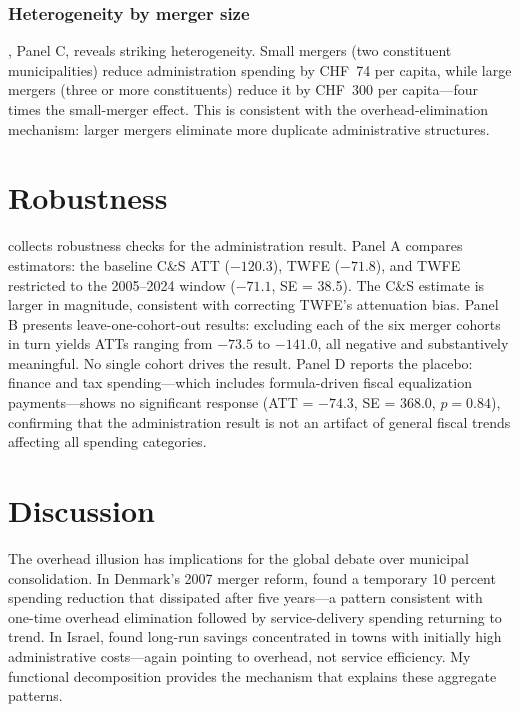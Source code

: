 \documentclass[12pt]{article}
\begin{document}
\subsubsection*{Heterogeneity by merger size} , Panel C, reveals striking heterogeneity. Small mergers (two constituent municipalities) reduce administration spending by CHF~74 per capita, while large mergers (three or more constituents) reduce it by CHF~300 per capita---four times the small-merger effect. This is consistent with the overhead-elimination mechanism: larger mergers eliminate more duplicate administrative structures.

\section{Robustness}

 collects robustness checks for the administration result. Panel A compares estimators: the baseline C\&S ATT ($-120.3$), TWFE ($-71.8$), and TWFE restricted to the 2005--2024 window ($-71.1$, SE = 38.5). The C\&S estimate is larger in magnitude, consistent with correcting TWFE's attenuation bias. Panel B presents leave-one-cohort-out results: excluding each of the six merger cohorts in turn yields ATTs ranging from $-73.5$ to $-141.0$, all negative and substantively meaningful. No single cohort drives the result. Panel D reports the placebo: finance and tax spending---which includes formula-driven fiscal equalization payments---shows no significant response (ATT = $-74.3$, SE = 368.0, $p = 0.84$), confirming that the administration result is not an artifact of general fiscal trends affecting all spending categories.

\section{Discussion}

The overhead illusion has implications for the global debate over municipal consolidation. In Denmark's 2007 merger reform, \citet{blom-hansen2016} found a temporary 10 percent spending reduction that dissipated after five years---a pattern consistent with one-time overhead elimination followed by service-delivery spending returning to trend. In Israel, \citet{reingewertz2012} found long-run savings concentrated in towns with initially high administrative costs---again pointing to overhead, not service efficiency. My functional decomposition provides the mechanism that explains these aggregate patterns.
\end{document}
